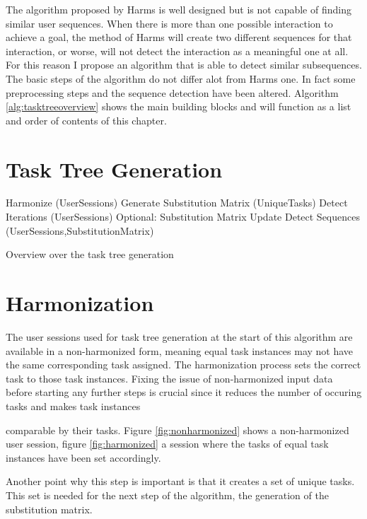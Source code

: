 The algorithm proposed by Harms is well designed but is not capable of finding similar user sequences. 
When there is more than one possible interaction to achieve a goal, the method of Harms will create two different sequences for that interaction, 
or worse, will not detect the interaction as a meaningful one at all. For this reason I propose an algorithm that is able to detect similar subsequences.
The basic steps of the algorithm do not differ alot from Harms one. In fact some preprocessing steps and the sequence detection have been altered.
Algorithm \ref{alg:tasktreeoverview} shows the main building blocks and will function as a list and order of contents of this chapter.
\section{Task Tree Generation}

\begin{algorithm}[h]
\begin{algorithmic}
	\State Harmonize (UserSessions)
	\State Generate Substitution Matrix (UniqueTasks)
	\State Detect Iterations (UserSessions)
	\State Optional: Substitution Matrix Update
	\State Detect Sequences (UserSessions,SubstitutionMatrix)
	\EndWhile
	\EndProcedure
\end{algorithmic}
\caption{Overview over the task tree generation}
\label{alg:tasktreeoverview}
\end{algorithm}

\section{Harmonization}
The user sessions used for task tree generation at the start of this algorithm are available in a non-harmonized form, 
meaning equal task instances may not have the same corresponding task assigned. The harmonization process sets the correct task to those task instances.
Fixing the issue of non-harmonized input data before starting any further steps is crucial since it reduces the number of occuring tasks and makes task instances

comparable by their tasks. Figure \ref{fig:nonharmonized} shows a non-harmonized user session, figure \ref{fig:harmonized} a session where the tasks of equal task instances have been set accordingly.

Another point why this step is important is that it creates a set of unique tasks. This set is needed for the next step of the algorithm, the generation of the substitution matrix.

